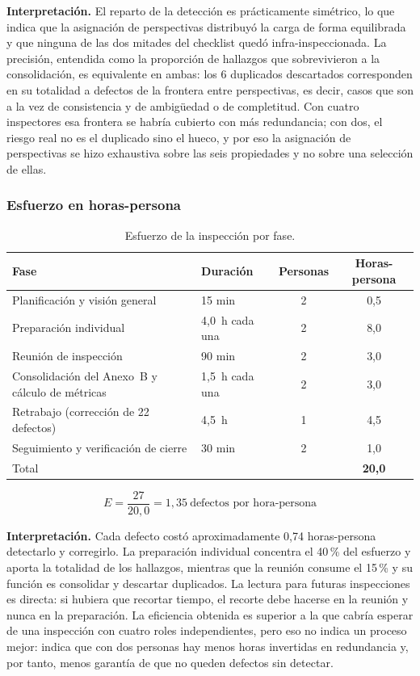 \documentclass[journal,onecolumn]{IEEEtran}
\begin{document}
	\textbf{Interpretación.} El reparto de la detección es prácticamente
	simétrico, lo que indica que la asignación de perspectivas distribuyó la
	carga de forma equilibrada y que ninguna de las dos mitades del checklist
	quedó infra-inspeccionada. La precisión, entendida como la proporción de
	hallazgos que sobrevivieron a la consolidación, es equivalente en ambas: los
	6 duplicados descartados corresponden en su totalidad a defectos de la
	frontera entre perspectivas, es decir, casos que son a la vez de
	consistencia y de ambigüedad o de completitud. Con cuatro inspectores esa
	frontera se habría cubierto con más redundancia; con dos, el riesgo real no
	es el duplicado sino el hueco, y por eso la asignación de perspectivas se
	hizo exhaustiva sobre las seis propiedades y no sobre una selección de
	ellas.
	
	\subsubsection{Esfuerzo en horas-persona}
	
	\begin{table}[h!]
		\centering
		\caption{Esfuerzo de la inspección por fase.}
		\label{tab:esfuerzo-fase}
		\begin{tabular}{p{5.5cm} p{2.3cm} c c}
			\toprule
			\textbf{Fase} & \textbf{Duración} & \textbf{Personas} & \textbf{Horas-persona} \\
			\midrule
			Planificación y visión general & 15 min & 2 & 0,5 \\
			Preparación individual & 4,0~h cada una & 2 & 8,0 \\
			Reunión de inspección & 90 min & 2 & 3,0 \\
			Consolidación del Anexo~B y cálculo de métricas & 1,5~h cada una & 2 & 3,0 \\
			Retrabajo (corrección de 22 defectos) & 4,5~h & 1 & 4,5 \\
			Seguimiento y verificación de cierre & 30 min & 2 & 1,0 \\
			\midrule
			\multicolumn{3}{l}{Total} & \textbf{20,0} \\
			\bottomrule
		\end{tabular}
	\end{table}
	
	\begin{equation}
		E = \frac{27}{20{,}0} = 1{,}35 \ \text{defectos por hora-persona}
	\end{equation}
	
	\textbf{Interpretación.} Cada defecto costó aproximadamente 0,74
	horas-persona detectarlo y corregirlo. La preparación individual concentra
	el 40\,\% del esfuerzo y aporta la totalidad de los hallazgos, mientras que
	la reunión consume el 15\,\% y su función es consolidar y descartar
	duplicados. La lectura para futuras inspecciones es directa: si hubiera que
	recortar tiempo, el recorte debe hacerse en la reunión y nunca en la
	preparación. La eficiencia obtenida es superior a la que cabría esperar de
	una inspección con cuatro roles independientes, pero eso no indica un
	proceso mejor: indica que con dos personas hay menos horas invertidas en
	redundancia y, por tanto, menos garantía de que no queden defectos sin
	detectar.
	
\end{document}
